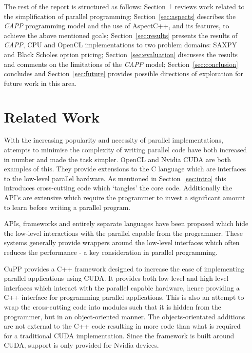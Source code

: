 \documentclass{sig-alternate-05-2015}
\begin{document}
The rest of the report is structured as follows: Section~\ref{sec:related}
reviews work related to the simplification of parallel programming;
Section~\ref{sec:aspects} describes the \textit{CAPP} programming model and the use 
of AspectC++, and its features, to achieve the above mentioned goals; Section~\ref{sec:results}
presents the results of \textit{CAPP}, CPU and OpenCL implementations to two
problem domains:
SAXPY and Black Scholes option pricing;
Section~\ref{sec:evaluation} discusses the results and comments on the limitations 
of the \textit{CAPP} model; 
Section~\ref{sec:conclusion} concludes and Section~\ref{sec:future}
provides possible directions of exploration for future work in this area.

\section{Related Work}\label{sec:related}

With the increasing popularity and necessity of parallel implementations,
attempts to minimise the complexity of writing parallel code have both increased
in number and made the task simpler. OpenCL and Nvidia CUDA are both examples of
this. They provide extensions to the C language which are interfaces to the low-level
parallel hardware. As mentioned in Section~\ref{sec:intro} this
introduces cross-cutting code which `tangles' the core code. Additionally the API's 
are extensive which require the programmer to invest a significant amount to
learn before writing a parallel program.

APIs, frameworks and entirely separate languages have been proposed which hide the low-level 
interactions with the parallel capable from the programmer.
These systems generally provide wrappers around the low-level interfaces 
which often reduces the performance - a key consideration in parallel
programming.

CuPP \cite{breit:cupp} provides a C++ framework designed to increase the ease of implementing parallel
applications using CUDA. It provides both low-level and high-level interfaces
which interact with the parallel capable hardware, hence providing a C++
interface for programming parallel applications. This is also an attempt to wrap
the cross-cutting code into modules such that it is hidden from  the programmer,
but in an object-oriented manner. The objects-orientated additions are not
external to the C++ code resulting in more code than what is required for a traditional 
CUDA implementation. Since the framework is built around CUDA, support is only provided 
for Nvidia devices.
\end{document}
